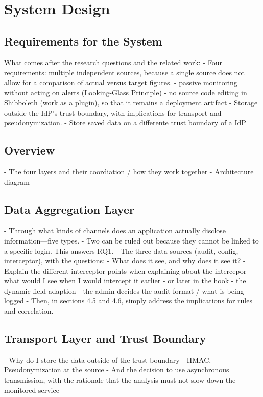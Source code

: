 \documentclass[../main.tex]{subfiles}
\begin{document}
\chapter{System Design}\label{ch:system-design}

\section{Requirements for the System}\label{sec:requirements}
What comes after the research questions and the related work:
- Four requirements: multiple independent sources, because a single source does not allow for a comparison of actual versus target figures. 
- passive monitoring without acting on alerts (Looking-Glass Principle)
- no source code editing in Shibboleth (work as a plugin), so that it remains a deployment artifact
- Storage outside the IdP's trust boundary, with implications for transport and pseudonymization.
- Store saved data on a differente trust boundary of a IdP

\section{Overview}\label{sec:overview}
- The four layers and their coordiation / how they work together
- Architecture diagram

\section{Data Aggregation Layer}\label{sec:dataaggregation}
- Through what kinds of channels does an application actually disclose information—five types.
- Two can be ruled out because they cannot be linked to a specific login. This answers RQ1.
- The three data sources (audit, config, interceptor), with the questions: 
    - What does it see, and why does it see it? 
    - Explain the different interceptor points when explaining about the intercepor
        - what would I see when I would intercept it earlier
        - or later in the hook
- the dynamic field adaption
- the admin decides the audit format / what is being logged
- Then, in sections 4.5 and 4.6, simply address the implications for rules and correlation.

\section{Transport Layer and Trust Boundary}\label{sec:trust}
- Why do I store the data outside of the trust boundary
- HMAC, Pseudonymization at the source
- And the decision to use asynchronous transmission, with the rationale that the analysis must not slow down the monitored service
\end{document}
